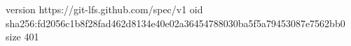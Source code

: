 version https://git-lfs.github.com/spec/v1
oid sha256:fd2056c1b8f28fad462d8134e40e02a36454788030ba5f5a79453087e7562bb0
size 401
